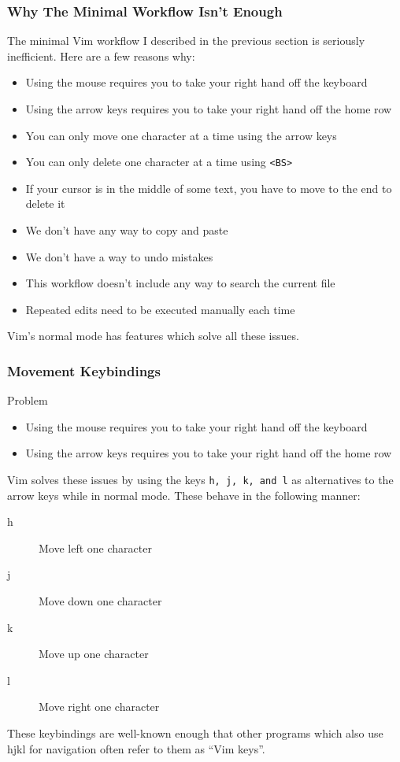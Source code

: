\documentclass{beamer}
\begin{document}
\begin{frame}[fragile]
    \frametitle{Why The Minimal Workflow Isn't Enough}
    \small
    The minimal Vim workflow I described in the previous section is seriously inefficient. Here are a few reasons why:
    \begin{itemize}
	\item Using the mouse requires you to take your right hand off the keyboard
	\item Using the arrow keys requires you to take your right hand off the home row
	\item You can only move one character at a time using the arrow keys
	\item You can only delete one character at a time using \verb+<BS>+
	\item If your cursor is in the middle of some text, you have to move to the end to delete it
	\item We don't have any way to copy and paste
	\item We don't have a way to undo mistakes
	\item This workflow doesn't include any way to search the current file
	\item Repeated edits need to be executed manually each time
    \end{itemize}
    Vim's normal mode has features which solve all these issues.
\end{frame}

\begin{frame}[fragile]
    \frametitle{Movement Keybindings}
    \small
    \begin{block}{Problem}
	\begin{itemize}
	    \item Using the mouse requires you to take your right hand off the keyboard
	    \item Using the arrow keys requires you to take your right hand off the home row
	\end{itemize}
    \end{block}
    Vim solves these issues by using the keys \verb+h, j, k, and l+ as alternatives to the arrow keys while in normal mode. These behave in the following manner:
    \begin{description}
	\item[h] Move left one character
	\item[j] Move down one character
	\item[k] Move up one character
	\item[l] Move right one character
    \end{description}
    These keybindings are well-known enough that other programs which also use hjkl for navigation often refer to them as \enquote{Vim keys}.
\end{frame}
\end{document}
